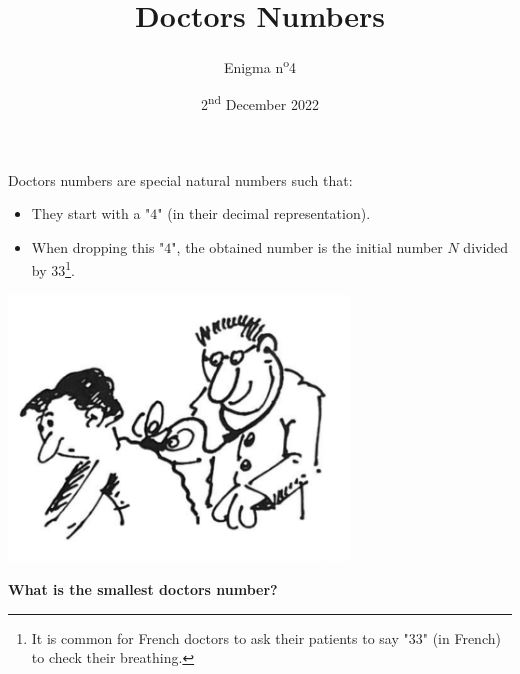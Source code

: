 \documentclass[a4paper, top=10mm]{article}
\title{\textbf{\huge{Doctors Numbers}}}
\author{Enigma n\textsuperscript{o}4}
\date{2\textsuperscript{nd} December 2022}
\begin{document}
	\maketitle
	
	Doctors numbers are special natural numbers such that:
	\begin{itemize}
		\item They start with a "$4$" (in their decimal representation).
		\item When dropping this "$4$", the obtained number is the initial number $N$ divided by $33$\footnote{It is common for French doctors to ask their patients to say "33" (in French) to check their breathing.}.
	\end{itemize}
	
	\vspace{1cm}
	
	\begin{center}
		\includegraphics[height=200pt]{04doctor.png}
	\end{center}
	
	\vspace{3cm}
	
	\textbf{What is the smallest doctors number?}
	
\end{document}

